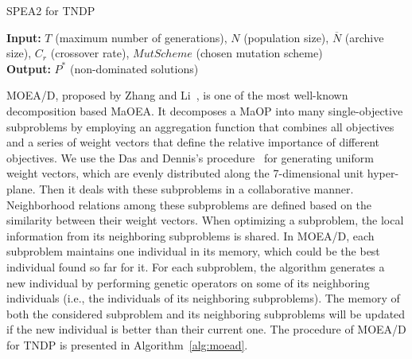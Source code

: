 \begin{algorithm}[!htbp]
	\caption{SPEA2 for TNDP}
	\textbf{Input:} $T$ (maximum number of generations), $N$ (population size), $\overline{N}$ (archive size), $C_r$ (crossover rate), $MutScheme$ (chosen mutation scheme)\\
	\textbf{Output:} $P^*$ (non-dominated solutions)
	\begin{algorithmic}[1]\label{alg:spea2}
		 
		\ENDWHILE
	\end{algorithmic}
\end{algorithm}

MOEA/D, proposed by Zhang and Li~\cite{zhang2007moea}, is one of the most well-known decomposition based MaOEA. It decomposes a MaOP into many single-objective subproblems by employing an aggregation function that combines all objectives and a series of weight vectors that define the relative importance of different objectives. We use the Das and Dennis's procedure~\cite{das1998normal} for generating uniform weight vectors, which are evenly distributed along the 7-dimensional unit hyper-plane. Then it deals with these subproblems in a collaborative manner. Neighborhood relations among these subproblems are defined based on the similarity between their weight vectors. When optimizing a subproblem, the local information from its neighboring subproblems is shared. In MOEA/D, each subproblem maintains one individual in its memory, which could be the best individual found so far for it. For each subproblem, the algorithm generates a new individual by performing genetic operators on some of its neighboring individuals (i.e., the individuals of its neighboring subproblems). The memory of both the considered subproblem and its neighboring subproblems will be updated if the new individual is better than their current one. The procedure of MOEA/D for TNDP is presented in Algorithm~\ref{alg:moead}.

